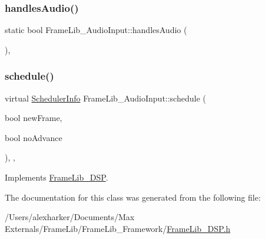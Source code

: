 \subsubsection{\texorpdfstring{handles\+Audio()}{handlesAudio()}}
{\footnotesize\ttfamily static bool Frame\+Lib\+\_\+\+Audio\+Input\+::handles\+Audio (\begin{DoxyParamCaption}{ }\end{DoxyParamCaption})\hspace{0.3cm}{\ttfamily [inline]}, {\ttfamily [static]}}

\mbox{\label{class_frame_lib___audio_input_aaa16c1cb4486b196362b5edf1c60f689}} 
\subsubsection{\texorpdfstring{schedule()}{schedule()}}
{\footnotesize\ttfamily virtual \hyperlink{struct_frame_lib___d_s_p_1_1_scheduler_info}{Scheduler\+Info} Frame\+Lib\+\_\+\+Audio\+Input\+::schedule (\begin{DoxyParamCaption}\item[{bool}]{new\+Frame,  }\item[{bool}]{no\+Advance }\end{DoxyParamCaption})\hspace{0.3cm}{\ttfamily [inline]}, {\ttfamily [protected]}, {\ttfamily [virtual]}}



Implements \hyperlink{class_frame_lib___d_s_p}{Frame\+Lib\+\_\+\+D\+SP}.



The documentation for this class was generated from the following file\+:\begin{DoxyCompactItemize}
\item 
/\+Users/alexharker/\+Documents/\+Max Externals/\+Frame\+Lib/\+Frame\+Lib\+\_\+\+Framework/\hyperlink{_frame_lib___d_s_p_8h}{Frame\+Lib\+\_\+\+D\+S\+P.\+h}\end{DoxyCompactItemize}
